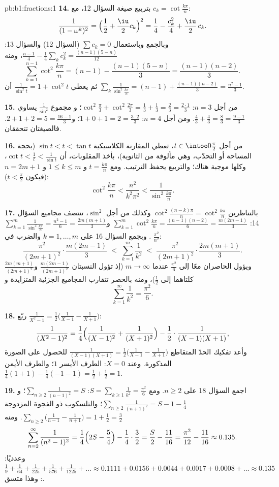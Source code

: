 \begin{solution}{pb:b1:fractions:1}
\textbf{14.} بتربيع صيغة السؤال 12، مع $c_k =
\cot\frac{k\pi}n$:
\[
\frac1{(1-\omega^k)^2}
= \Bigl(\frac12 + \frac\iu2 c_k\Bigr)^2
= \frac14 - \frac{c_k^2}4 + \frac\iu2\,c_k .
\]
وبالجمع وباستعمال $\sum c_k = 0$ (السؤال 12) والسؤال 13:
$\frac{n-1}4 - \frac14\sum_k c_k^2 = \frac{(n-1)(5-n)}{12}$، ومنه
\[
\sum_{k=1}^{n-1}\cot^2\frac{k\pi}n
= (n-1) - \frac{(n-1)(5-n)}3 = \frac{(n-1)(n-2)}3 .
\]
ثم يعطي $\frac1{\sin^2t} = 1 + \cot^2t$ أن
$\sum_k\frac1{\sin^2\frac{k\pi}n} = (n-1) +
\frac{(n-1)(n-2)}3 = \frac{n^2-1}3$.

\textbf{15.} من أجل $n = 3$: $\cot^2\frac\pi3 + \cot^2\frac{2\pi}3 =
\frac13 + \frac13 = \frac23 = \frac{2\cdot1}3$؛ و
مجموع $\frac1{\sin^2}$ يساوي $\frac43 + \frac43 = \frac83 =
\frac{9-1}3$. ومن أجل $n = 4$: $1 + 0 + 1 = 2 = \frac{3\cdot2}3$؛ و$2
+ 1 + 2 = 5 = \frac{16-1}3$. فالصيغتان تتحققان.

\textbf{16.} من أجل $t \in \intoo0{\frac\pi2}$، تعطي المقارنة
الكلاسيكية $\sin t < t < \tan t$ (بحجة المساحة أو التحدّب،
وهي مألوفة من الثانوية)، بأخذ المقلوبات، أن $\cot t <
\frac1t < \frac1{\sin t}$، وكلها موجبة هناك؛ والتربيع
يحفظ الترتيب. ومع $t = \frac{k\pi}n$ و $1 \leq k \leq m$ و
$n = 2m+1$ (فيكون $t < \frac\pi2$):
\[
\cot^2\frac{k\pi}n < \frac{n^2}{k^2\pi^2} <
\frac1{\sin^2\frac{k\pi}n} .
\]

\textbf{17.} بالتناظرين $\cot^2\frac{(n-k)\pi}n =
\cot^2\frac{k\pi}n$ وكذلك من أجل $\sin^2$، تنتصف مجاميع
السؤال 14: $\sum_{k=1}^{m}\cot^2\frac{k\pi}n = \frac{(n-1)(n-2)}6 =
\frac{m(2m-1)}3$ و$\sum_{k=1}^m\frac1{\sin^2\frac{k\pi}n} =
\frac{n^2-1}6 = \frac{2m(m+1)}3$. وبجمع السؤال 16 على $k =
1, \dots, m$ والضرب في $\frac{\pi^2}{n^2}$:
\[
\frac{\pi^2}{(2m+1)^2}\cdot\frac{m(2m-1)}3
\;<\; \sum_{k=1}^{m}\frac1{k^2} \;<\;
\frac{\pi^2}{(2m+1)^2}\cdot\frac{2m(m+1)}3 .
\]
ويؤول الحاصران معًا إلى $\frac{\pi^2}6$ عندما $m \to \infty$ (إذ تؤول النسبتان
$\frac{m(2m-1)}{(2m+1)^2}$ و$\frac{2m(m+1)}{(2m+1)^2}$ كلتاهما
إلى $\frac12$)، ومنه بالحصر تتقارب المجاميع الجزئية المتزايدة
و
\[
\sum_{k=1}^{\infty}\frac1{k^2} = \frac{\pi^2}6 .
\]

\textbf{18.} ربّع $\frac1{X^2-1} = \frac12\bigl(\frac1{X-1} -
\frac1{X+1}\bigr)$:
\[
\frac1{(X^2-1)^2} = \frac14\Bigl(\frac1{(X-1)^2} +
\frac1{(X+1)^2}\Bigr) - \frac12\cdot\frac1{(X-1)(X+1)} ,
\]
وأعد تفكيك الحدّ المتقاطع $\frac1{(X-1)(X+1)} =
\frac12\bigl(\frac1{X-1} - \frac1{X+1}\bigr)$ للحصول على الصورة
المذكورة. وعند $X = 0$: الطرف الأيسر $1$؛ والطرف الأيمن $\frac14(1 + 1) -
\frac14(-1 - 1) = \frac12 + \frac12 = 1$.

\textbf{19.} اجمع السؤال 18 على $n \geq 2$. ومع $S =
\sum_{k\geq1}\frac1{k^2} = \frac{\pi^2}6$: $\sum_{n\geq2}
\frac1{(n-1)^2} = S$؛ و$\sum_{n\geq2}\frac1{(n+1)^2} = S - 1 -
\frac14$؛ والتلسكوب ذو الفجوة المزدوجة $\sum_{n\geq2}\bigl(
\frac1{n-1} - \frac1{n+1}\bigr) = 1 + \frac12 = \frac32$. ومنه
\[
\sum_{n=2}^{\infty}\frac1{(n^2-1)^2}
= \frac14\Bigl(2S - \frac54\Bigr) - \frac14\cdot\frac32
= \frac S2 - \frac{11}{16}
= \frac{\pi^2}{12} - \frac{11}{16} \approx 0.135 .
\]
وعدديًا: $\frac19 + \frac1{64} + \frac1{225} + \frac1{576} +
\frac1{1225} + \dots \approx 0.1111 + 0.0156 + 0.0044 + 0.0017 +
0.0008 + \dots \approx 0.135$: وهذا متسق.


\end{solution}
